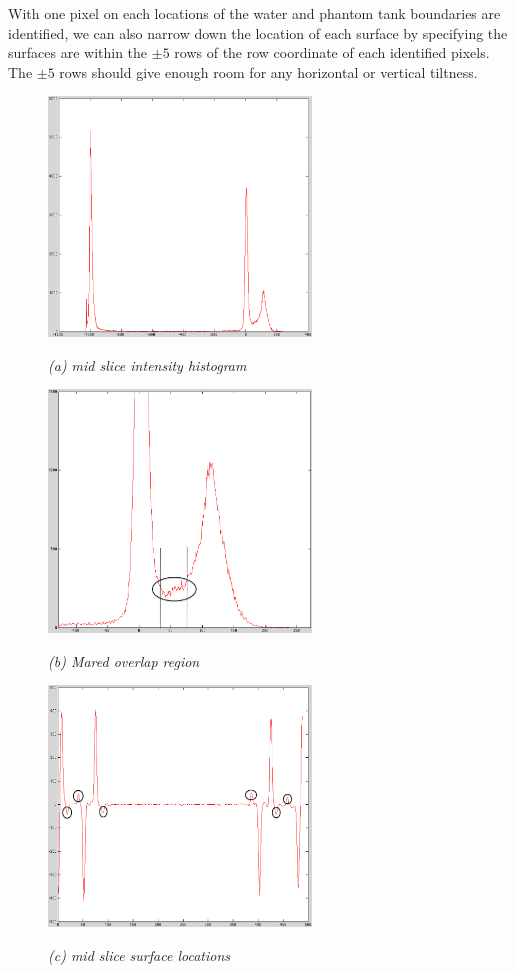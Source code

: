 With one pixel on each locations of the water and phantom tank boundaries are identified, 
we can also narrow down the 
location of each surface by specifying the surfaces are within the $\pm5$ rows of the row coordinate of each
identified pixels. The $\pm5$ rows should give enough room for any horizontal or vertical tiltness.

\begin{figure}[htb]
  \begin{minipage}[t]{2.75in}
    \centering
    \centerline{\mbox{\includegraphics[width=2.75in]{data_extraction/images/mid_slice_histogram.eps}}}
    \centerline{\emph{(a) mid slice intensity histogram}}
  \end{minipage}\medskip
  \begin{minipage}[t]{2.75in}
    \centering
    \centerline{\mbox{\includegraphics[width=2.75in]{data_extraction/images/mid_slice_tank_and_water_overlap_marked.eps}}}
    \centerline{\emph{(b) Mared overlap region}}
  \end{minipage}
  \begin{minipage}[t]{2.75in}
    \centering
    \centerline{\mbox{\includegraphics[width=2.75in]{data_extraction/images/mid_slice_gradient_marked.eps}}}
    \centerline{\emph{(c) mid slice surface locations}}
  \end{minipage}


\end{figure}
